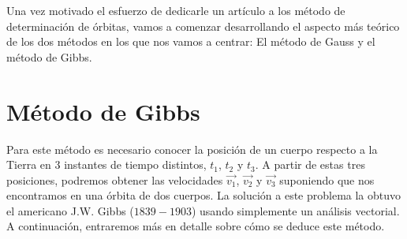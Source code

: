 \documentclass{article}
\numberwithin{equation}{section}
\begin{document}
Una vez motivado el esfuerzo de dedicarle un artículo a los 
método de determinación de órbitas, vamos a comenzar desarrollando 
el aspecto más teórico de los dos métodos en los que nos 
vamos a centrar: El método de Gauss y el método de Gibbs.
\section{Método de Gibbs}
Para este método es necesario conocer la posición de un cuerpo 
respecto a la Tierra en 3 instantes de tiempo distintos, 
$t_{1}$, $t_{2}$ y $t_{3}$. A partir de estas tres posiciones, 
podremos obtener las velocidades $\overrightarrow{v_{1}}$, 
$\overrightarrow{v_{2}}$ y $\overrightarrow{v_{3}}$ suponiendo 
que nos encontramos en una órbita de dos cuerpos. La solución a 
este problema la obtuvo el americano J.W. Gibbs ($1839-1903$) 
usando simplemente un análisis vectorial. A continuación, 
entraremos más en detalle sobre cómo se deduce este método.
\end{document}
